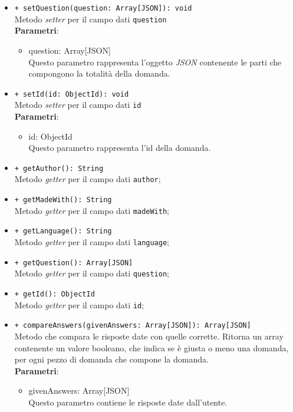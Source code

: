 \begin{itemize}
\begin{itemize}
				\item \texttt{+ setQuestion(question: Array[JSON]): void} \\
				Metodo \textit{setter} per il campo dati \texttt{question}\\
				\textbf{Parametri}:
				\begin{itemize}
					\item {question: Array[JSON]}\\
					Questo parametro rappresenta l'oggetto \textit{JSON} contenente le parti che compongono la totalità della domanda.
				\end{itemize}
				
				\item \texttt{+ setId(id: ObjectId): void} \\
				Metodo \textit{setter} per il campo dati \texttt{id}\\
				\textbf{Parametri}:
				\begin{itemize}
					\item {id: ObjectId}\\
					Questo parametro rappresenta l'id della domanda.
				\end{itemize}
				
				\item \texttt{+ getAuthor(): String} \\
				Metodo \textit{getter} per il campo dati \texttt{author};
				
				\item \texttt{+ getMadeWith(): String} \\
				Metodo \textit{getter} per il campo dati \texttt{madeWith};
				
				\item \texttt{+ getLanguage(): String} \\
				Metodo \textit{getter} per il campo dati \texttt{language};

				\item \texttt{+ getQuestion(): Array[JSON]} \\
				Metodo \textit{getter} per il campo dati \texttt{question};
				
				\item \texttt{+ getId(): ObjectId} \\
				Metodo \textit{getter} per il campo dati \texttt{id};
				
				\item \texttt{+ compareAnswers(givenAnswers: Array[JSON]): Array[JSON]} \\
				Metodo che compara le risposte date con quelle corrette. Ritorna un array contenente un valore booleano, che indica se è giusta o meno una domanda, per ogni pezzo di domanda che compone la domanda. \\
				\textbf{Parametri}:
				\begin{itemize}
					\item {givenAnswers: Array[JSON]}\\
					Questo parametro contiene le risposte date dall'utente. 
				\end{itemize}
				

\end{itemize}
\end{itemize}
